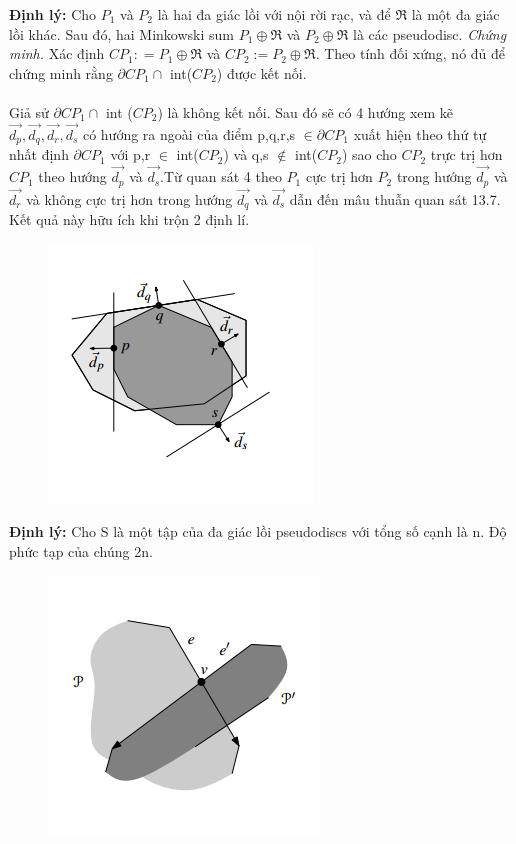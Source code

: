 \documentclass[a4paper,12pt]{report}
\begin{document}
\textbf{Định lý:} Cho $P_1$ và $P_2$ là hai đa giác lồi với nội rời rạc, và để $\Re$ là một đa giác lồi khác. Sau đó, hai Minkowski sum  $P_1 \oplus \Re$ và $P_2 \oplus \Re$ là các pseudodisc.
\textit{Chứng minh.} Xác định $CP_1: = P_1 \oplus \Re$ và $CP_2 := P_2 \oplus \Re$. Theo tính đối xứng, nó đủ để chứng minh rằng $\partial CP_1 \cap $ int($CP_2$) được kết nối. \\ \\
Giả sử $\partial CP_1 \cap$ int ($CP_2$) là không kết nối. Sau đó sẽ có 4 hướng xem kẽ $\overrightarrow{d_p}, \overrightarrow{d_q},\overrightarrow{d_r},\overrightarrow{d_s}$ có hướng ra ngoài của điểm p,q,r,s $\in \partial CP_1$ xuất hiện  theo thứ tự nhất định $\partial CP_1$ với p,r $\in$ int($CP_2$) và q,s $\notin$ int($CP_2$) sao cho $CP_2$  trực trị hơn $CP_1$ theo hướng $\overrightarrow{d_p}$ và $\overrightarrow{d_s}$.Từ quan sát 4 theo $P_1$ cực trị hơn $P_2$ trong hướng $\overrightarrow{d_p}$ và $\overrightarrow{d_r}$ và không cực trị hơn trong hướng $\overrightarrow{d_q}$ và $\overrightarrow{d_s}$ dẫn đến mâu thuẫn quan sát 13.7. Kết quả này hữu ích khi trộn 2 định lí. \\
\begin{figure}[H]
\centering
\includegraphics[width=0.4\linewidth]{8.png}
\end{figure}
\textbf{Định lý: }  Cho S là một tập của đa giác lồi pseudodiscs với tổng số cạnh là n. Độ phức tạp của chúng 2n.
\begin{figure}[H]
\centering
\includegraphics[width=0.4\linewidth]{9.png}
\end{figure}
\end{document}
